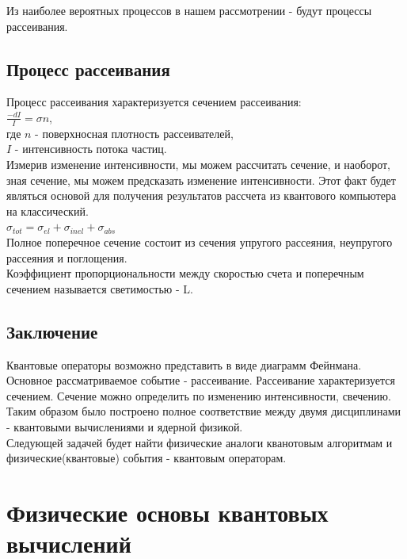 \documentclass[11pt]{report}
\begin{document}
Из наиболее вероятных процессов в нашем рассмотрении - будут процессы рассеивания.
\section{Процесс рассеивания}
Процесс рассеивания характеризуется сечением рассеивания: \\

$\frac{-dI}{I} = \sigma n$, \\

где $n$ - поверхносная плотность рассеивателей, \\

$I$ - интенсивность потока частиц. \\

Измерив изменение интенсивности, мы можем рассчитать сечение, и наоборот, зная сечение, мы можем предсказать изменение интенсивности. Этот факт будет являться основой для получения результатов рассчета из квантового компьютера на классический.\\

$\sigma_{tot} = \sigma_{el}+\sigma_{inel}+\sigma_{abs}$\\

Полное поперечное сечение состоит из сечения упругого рассеяния, неупругого рассеяния и поглощения.\\

Коэффициент пропорциональности между скоростью счета и поперечным сечением называется светимостью - L.\\

\section{Заключение}
Квантовые операторы возможно представить в виде диаграмм Фейнмана. Основное рассматриваемое событие - рассеивание. Рассеивание характеризуется сечением. Сечение можно определить по изменению интенсивности, свечению. \\

Таким образом было построено полное соответствие между двумя дисциплинами - квантовыми вычислениями и ядерной физикой. \\

Следующей задачей будет найти физические аналоги кванотовым алгоритмам и физические(квантовые) события - квантовым операторам. \\

\chapter{Физические основы квантовых вычислений}
\end{document}
